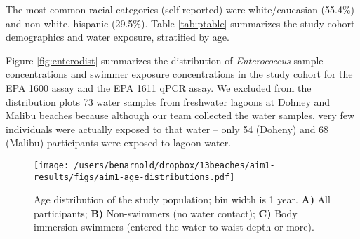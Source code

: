 \documentclass[12pt]{article}\usepackage[]{graphicx}\usepackage[]{color}
\begin{document}
The most common racial categories (self-reported) were white/caucasian (55.4\%) and non-white, hispanic (29.5\%). Table \ref{tab:ptable} summarizes the study cohort demographics and water exposure, stratified by age.

Figure \ref{fig:enterodist} summarizes the distribution of \emph{Enterococcus} sample concentrations and swimmer exposure concentrations in the study cohort for the EPA 1600 assay and the EPA 1611 qPCR assay. We excluded from the distribution plots 73 water samples from freshwater lagoons at Dohney and Malibu beaches because although our team collected the water samples, very few individuals were actually exposed to that water -- only 54 (Doheny) and 68 (Malibu) participants were exposed to lagoon water.


\begin{figure}
\begin{center}
\texttt{[image: /users/benarnold/dropbox/13beaches/aim1-results/figs/aim1-age-distributions.pdf]}
\caption{Age distribution of the study population; bin width is 1 year. \textbf{A)} All participants; \textbf{B)} Non-swimmers (no water contact); \textbf{C)} Body immersion swimmers (entered the water to waist depth or more). \label{fig:agedist}}
\end{center}
\end{figure}
\end{document}
